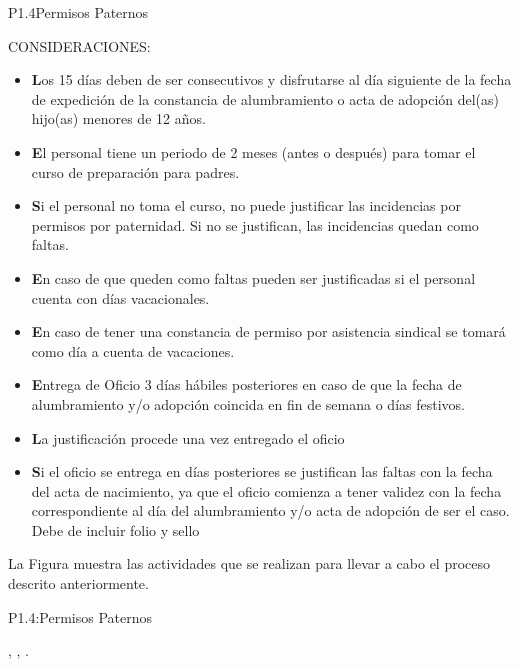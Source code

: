 \begin{Proceso}{P1.4}{Permisos Paternos}
{   \newline CONSIDERACIONES:\\
    \begin{itemize} 
    	\item \textbf Los 15 días deben de ser consecutivos y disfrutarse al día siguiente de la fecha de expedición de la constancia de alumbramiento o acta de adopción del(as) hijo(as) menores de 12 años. 
       	\item \textbf El personal tiene un periodo de 2 meses (antes o después) para tomar el curso de preparación  para padres.
        \item \textbf Si el personal no toma el curso, no puede justificar las incidencias por permisos por paternidad. Si no se justifican, las incidencias quedan como faltas.
        \item \textbf En caso de que queden como faltas pueden ser justificadas si el personal cuenta con días vacacionales. 
	    \item \textbf En caso de tener una constancia de permiso por asistencia sindical se tomará como día a cuenta de vacaciones. 
    	\item \textbf Entrega de Oficio 3 días hábiles posteriores en caso de que la fecha de alumbramiento y/o adopción coincida en fin de semana o días festivos. 
	    \item \textbf La justificación procede una vez entregado el oficio 
   	    \item \textbf Si el oficio se entrega en días posteriores se justifican las faltas con la fecha del acta de nacimiento, ya que el oficio comienza a tener validez con la fecha correspondiente al día del alumbramiento  y/o  acta de adopción de ser el caso.  Debe de incluir folio y sello

     
    \end{itemize}
   

    
    \smallskip
    \noindent La Figura  muestra las actividades que se realizan para llevar a cabo el proceso descrito anteriormente.

    }{P1.4:Permisos Paternos}


     { %
        ,
        ,
        .
    }


\end{Proceso}
